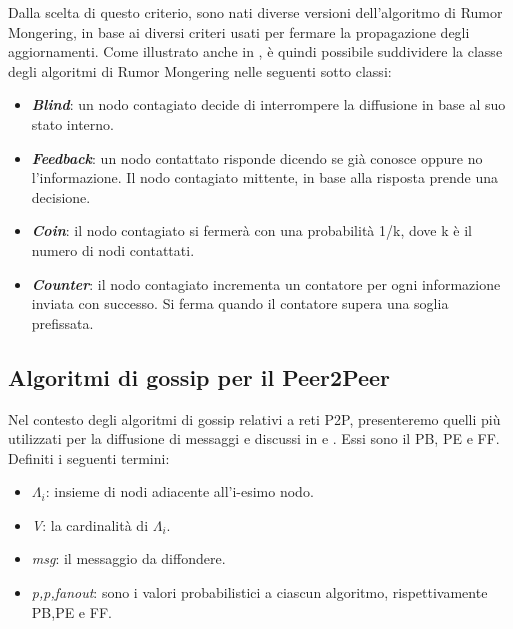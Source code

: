 Dalla scelta di questo criterio, sono nati diverse versioni dell'algoritmo di Rumor Mongering, in base ai diversi criteri usati per fermare la propagazione degli aggiornamenti. Come illustrato anche in \cite{schindel2004-epidemicAlg}, è quindi possibile suddividere la classe degli algoritmi di Rumor Mongering nelle seguenti sotto classi:
\begin{itemize}
	\item \textbf{\textit{Blind}}: un nodo contagiato decide di interrompere la diffusione in base al suo stato interno.
	\item \textbf{\textit{Feedback}}: un nodo contattato risponde dicendo se già conosce oppure no l'informazione. Il nodo contagiato mittente, in base alla risposta prende una decisione.
	\item \textbf{\textit{Coin}}: il nodo contagiato si fermerà con una probabilità 1/k, dove k è il numero di nodi contattati.
	\item \textbf{\textit{Counter}}: il nodo contagiato incrementa un contatore per ogni informazione inviata con successo. Si ferma quando il contatore supera una soglia prefissata.
\end{itemize}

\subsection{Algoritmi di gossip per il Peer2Peer}
\label{subsec:alg_p2p}
Nel contesto degli algoritmi di gossip relativi a reti \acs{P2P}, presenteremo quelli più utilizzati per la diffusione di messaggi e discussi in \cite{comparisonGAonRT2012} e \cite{comparisonGAonRT2014-ita}. Essi sono il \acf{PB}, \acf{PE} e \acf{FF}. Definiti i seguenti termini:
\begin{itemize}
	\item $ \varLambda_{i} $: insieme di nodi adiacente all'i-esimo nodo.
	\item \textit{V}: la cardinalità di $ \Lambda_{i} $.
	\item \textit{msg}: il messaggio da diffondere.
	\item \textit{p,p,fanout}: sono i valori probabilistici a ciascun algoritmo, rispettivamente PB,PE e FF.
\end{itemize}
\bigskip

